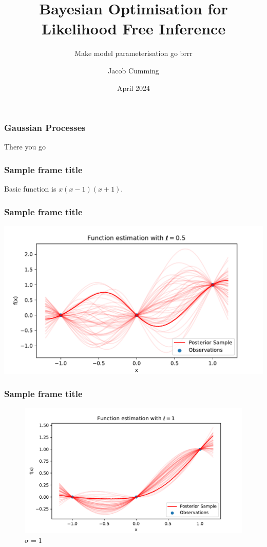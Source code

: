\documentclass{beamer}
\title[BOLFI]{Bayesian Optimisation for Likelihood Free Inference}
\subtitle{Make model parameterisation go brrr}
\author{Jacob Cumming}
\institute{University of Melbourne}
\date{April 2024}
\begin{document}
\frame{\titlepage}

\begin{frame}
    \frametitle{Gaussian Processes}
    There you go
\end{frame}


\begin{frame}
    \frametitle{Sample frame title}
    Basic function is $x(x-1)(x+1).$
\end{frame}

\begin{frame}
    \frametitle{Sample frame title}
    \includegraphics[width=\textwidth]{flatish_GP_ell_5_tenths.pdf}
\end{frame}

\begin{frame}
    \frametitle{Sample frame title}
    \begin{figure}
        \centering
        \includegraphics[width=\textwidth]{flatish_GP_ell_10_tenths.pdf}
        \caption{$\sigma = 1$}
    \end{figure}
\end{frame}
\end{document}
